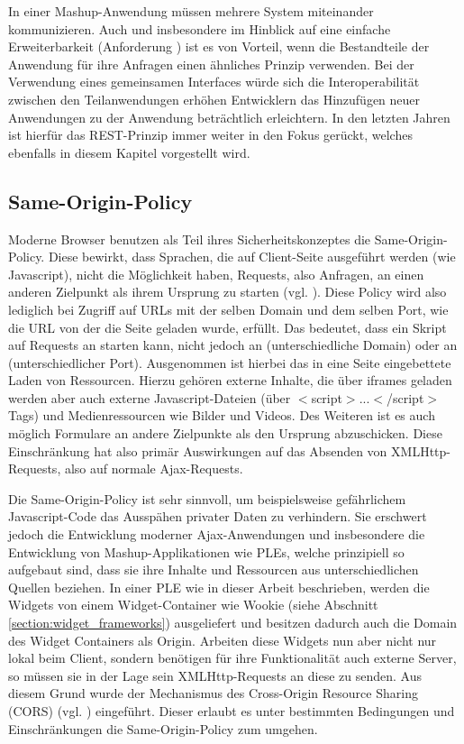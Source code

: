 In einer Mashup-Anwendung müssen mehrere System miteinander kommunizieren. Auch und insbesondere im Hinblick auf eine einfache Erweiterbarkeit (Anforderung ) ist es von Vorteil, wenn die Bestandteile der Anwendung für ihre Anfragen einen ähnliches Prinzip verwenden. Bei der Verwendung eines gemeinsamen Interfaces würde sich die Interoperabilität zwischen den Teilanwendungen erhöhen Entwicklern das Hinzufügen neuer Anwendungen zu der Anwendung beträchtlich erleichtern. In den letzten Jahren ist hierfür das REST-Prinzip immer weiter in den Fokus gerückt, welches ebenfalls in diesem Kapitel vorgestellt wird.
% 
\subsection{Same-Origin-Policy}\label{section:same_origin_policy}
Moderne Browser benutzen als Teil ihres Sicherheitskonzeptes die Same-Origin-Policy. Diese bewirkt, dass Sprachen, die auf Client-Seite ausgeführt werden (wie Javascript), nicht die Möglichkeit haben, Requests, also Anfragen, an einen anderen Zielpunkt als ihrem Ursprung zu starten (vgl. \cite{Ruderman2008}). Diese Policy wird also lediglich bei Zugriff auf URLs mit der selben Domain und dem selben Port, wie die URL von der die Seite geladen wurde, erfüllt. Das bedeutet, dass ein Skript auf  Requests an  starten kann, nicht jedoch an  (unterschiedliche Domain) oder an  (unterschiedlicher Port). Ausgenommen ist hierbei das in eine Seite eingebettete Laden von Ressourcen. Hierzu gehören externe Inhalte, die über iframes geladen werden aber auch externe Javascript-Dateien (über $<$script$>$...$<$/script$>$ Tags) und Medienressourcen wie Bilder und Videos. Des Weiteren ist es auch möglich Formulare an andere Zielpunkte als den Ursprung abzuschicken. Diese Einschränkung hat also primär Auswirkungen auf das Absenden von XMLHttp-Requests, also auf normale Ajax-Requests.

Die Same-Origin-Policy ist sehr sinnvoll, um beispielsweise gefährlichem Javascript-Code das Ausspähen privater Daten zu verhindern. Sie erschwert jedoch die Entwicklung moderner Ajax-Anwendungen und insbesondere die Entwicklung von Mashup-Applikationen wie PLEs, welche prinzipiell so aufgebaut sind, dass sie ihre Inhalte und Ressourcen aus unterschiedlichen Quellen beziehen. In einer PLE wie in dieser Arbeit beschrieben, werden die Widgets von einem Widget-Container wie Wookie (siehe Abschnitt \ref{section:widget_frameworks}) ausgeliefert und besitzen dadurch auch die Domain des Widget Containers als Origin. Arbeiten diese Widgets nun aber nicht nur lokal beim Client, sondern benötigen für ihre Funktionalität auch externe Server, so müssen sie in der Lage sein XMLHttp-Requests an diese zu senden. Aus diesem Grund wurde der Mechanismus des Cross-Origin Resource Sharing (CORS) (vgl. \cite{vanKesteren2012}) eingeführt. Dieser erlaubt es unter bestimmten Bedingungen und Einschränkungen die Same-Origin-Policy zum umgehen.

